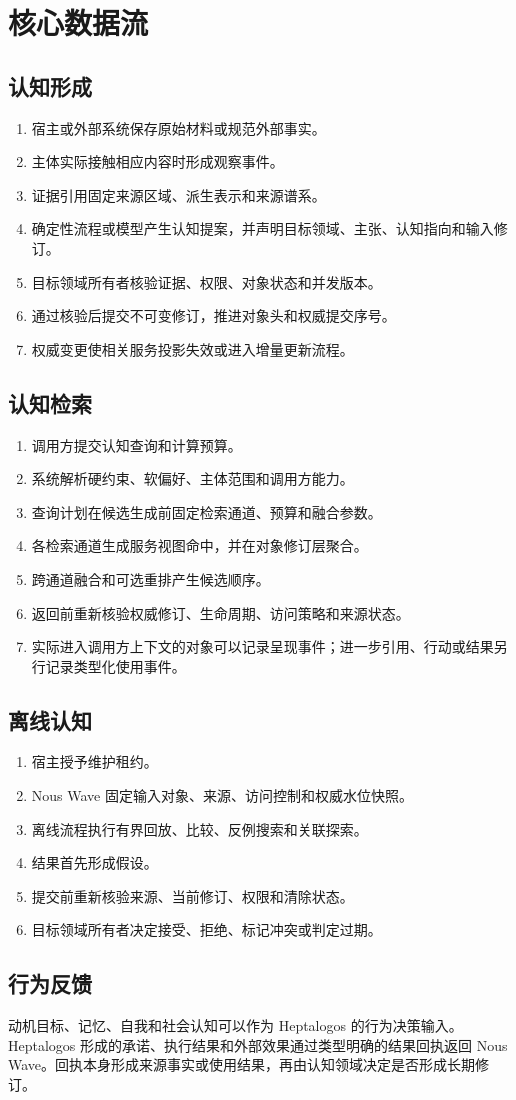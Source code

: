 \chapter{核心数据流}

\section{认知形成}

\begin{enumerate}
\item 宿主或外部系统保存原始材料或规范外部事实。
\item 主体实际接触相应内容时形成观察事件。
\item 证据引用固定来源区域、派生表示和来源谱系。
\item 确定性流程或模型产生认知提案，并声明目标领域、主张、认知指向和输入修订。
\item 目标领域所有者核验证据、权限、对象状态和并发版本。
\item 通过核验后提交不可变修订，推进对象头和权威提交序号。
\item 权威变更使相关服务投影失效或进入增量更新流程。
\end{enumerate}

\section{认知检索}

\begin{enumerate}
\item 调用方提交认知查询和计算预算。
\item 系统解析硬约束、软偏好、主体范围和调用方能力。
\item 查询计划在候选生成前固定检索通道、预算和融合参数。
\item 各检索通道生成服务视图命中，并在对象修订层聚合。
\item 跨通道融合和可选重排产生候选顺序。
\item 返回前重新核验权威修订、生命周期、访问策略和来源状态。
\item 实际进入调用方上下文的对象可以记录呈现事件；进一步引用、行动或结果另行记录类型化使用事件。
\end{enumerate}

\section{离线认知}

\begin{enumerate}
\item 宿主授予维护租约。
\item Nous Wave 固定输入对象、来源、访问控制和权威水位快照。
\item 离线流程执行有界回放、比较、反例搜索和关联探索。
\item 结果首先形成假设。
\item 提交前重新核验来源、当前修订、权限和清除状态。
\item 目标领域所有者决定接受、拒绝、标记冲突或判定过期。
\end{enumerate}

\section{行为反馈}

动机目标、记忆、自我和社会认知可以作为 Heptalogos 的行为决策输入。Heptalogos 形成的承诺、执行结果和外部效果通过类型明确的结果回执返回 Nous Wave。回执本身形成来源事实或使用结果，再由认知领域决定是否形成长期修订。
